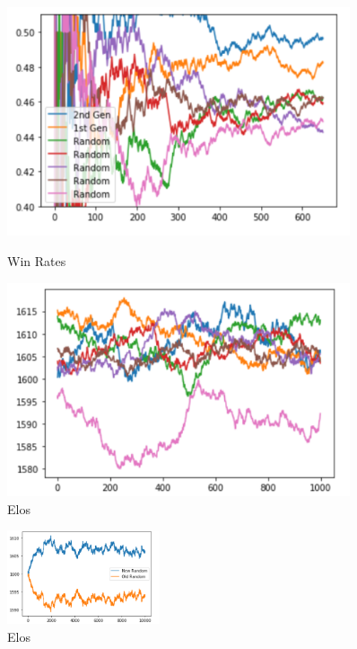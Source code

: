 \documentclass[]{article}
\begin{document}
\begin{figure}[H]
	\centering
	\begin{minipage}{0.5\textwidth}
		\centering
		\includegraphics[width=0.9\textwidth]{twogens}
		\caption{Win Rates}
	\end{minipage}\hfill
	\begin{minipage}{0.5\textwidth}
		\centering
		\includegraphics[width=0.9\textwidth]{manygens}
		\caption{Elos}
	\end{minipage}
\end{figure}
\begin{figure}
	\centering
	\includegraphics[width=0.4\textwidth]{tworandoms}
	\caption{Elos}
\end{figure}
\end{document}
